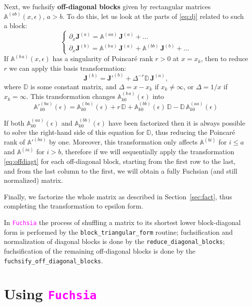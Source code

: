 \documentclass{elsarticle}
\newcommand{\eps}{\epsilon}
\newcommand{\fuchsia}{\textcolor{fuchsia}{\texttt{Fuchsia}}\xspace}
\newcommand{\code}[1]{\texttt{#1}}
\newcommand{\M}[1]{\mathbb{#1}} %
\newcommand{\V}[1]{\mathbf{#1}} %
\begin{document}
Next, we fuchsify {\bf off-diagonal blocks} given by rectangular matrices $\M A^{(ab)}(x,\eps)$, $a > b$.
To do this, let us look at the parts of \eqref{eq:dj} related to such a block:
\begin{equation}
  \begin{cases}
  \partial_x \V J^{(a)} =
    \M A^{(aa)}\,\V J^{(a)} + \ldots \\
  \partial_x \V J^{(b)} =
    \M A^{(b\,a)}\,\V J^{(a)} +
    \M A^{(bb)}\,\V J^{(b)} + \ldots
  \end{cases}
\end{equation}
If $\M A^{(b\,a)}(x,\eps)$ has a singularity of Poincar\'e rank $r>0$ at $x=x_k$, then to reduce $r$ we can apply this basis transformation:
\begin{equation}
  \label{eq:offdiagt}
  \V J^{(b)} = \V J'^{(b)} + \Delta^{-r} \M D\, \V J^{(a)},
\end{equation}
where $\M D$ is some constant matrix, and $\Delta=x-x_k$ if $x_k\ne\infty$, or $\Delta=1/x$ if $x_k=\infty$.
This transformation changes $\M A^{(b\,a)}_{k0}(\eps)$ into
\begin{equation}
  \M A'^{(ba)}_{k0}(\eps) = \M A^{(ba)}_{k0}\!(\eps) + r\,\M D + \M A^{(bb)}_{k0}\!(\eps) \, \M D - \M D\, \M A^{(aa)}_{k0}(\eps)
\end{equation}

If both $\M A^{(aa)}_{k0}(\eps)$ and $\M A^{(bb)}_{k0}(\eps)$ have been factorized then it is always possible to solve the right-hand side of this equation for $\M D$, thus reducing the Poincar\'e rank of $\M A'^{(ba)}$ by one.
Moreover, this transformation only affects $\M A^{(bi)}$ for $i \le a$ and $\M A^{(ia)}$ for $i > b$, therefore if we will sequentially apply the transformation \eqref{eq:offdiagt} for each off-diagonal block, starting from the first row to the last, and from the last column to the first, we will obtain a fully Fuchsian (and still normalized) matrix.

Finally, we factorize the whole matrix as described in Section~\ref{sec:fact}, thus completing the transformation to epsilon form.

In \fuchsia the process of shuffling a matrix to its shortest lower block-diagonal form is performed by the \code{block\_triangular\_form} routine; fuchsification and normalization of diagonal blocks is done by the \code{reduce\_diagonal\_blocks}; fuchsification of the remaining off-diagonal blocks is done by the \code{fuchsify\_off\_diagonal\_blocks}.


\section{Using \fuchsia}
\label{sec:3}
\end{document}
